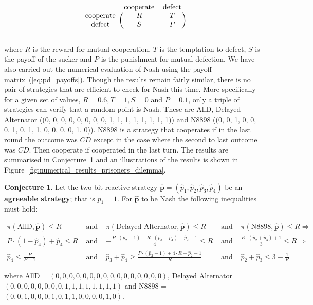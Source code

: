 \documentclass{article}
\theoremstyle{definition}
\newtheorem{conjecture}[theorem]{Conjecture}
\begin{document}
\begin{equation}\label{eq:pd_payoffs}
  \begin{blockarray}{ccc}
      & \text{cooperate} & \text{defect} \\
      \begin{block}{c(cc)}
          \text{cooperate} & R & T \\
          \text{defect} & S & P \\
      \end{block}
  \end{blockarray}
\end{equation}

where \(R\) is the reward for mutual cooperation, \(T\) is the temptation to
defect, \(S\) is the payoff of the sucker and \(P\) is the punishment for mutual
defection. We have also carried out the numerical evaluation of Nash using the
payoff matrix~(\ref{eq:pd_payoffs}). Though the results remain fairly similar,
there is no pair of strategies that are efficient to check for Nash this time.
More specifically for a given set of values, \(R=0.6, T=1, S=0\) and \(P=0.1\),
only a triple of strategies can verify that a random point is Nash. These are
AllD, Delayed Alternator ((0, 0, 0, 0, 0, 0, 0, 0, 1, 1, 1, 1, 1, 1, 1, 1)) and
N8898 ((0, 0, 1, 0, 0, 0, 1, 0, 1, 1, 0, 0, 0, 0, 1, 0)). N8898 is a strategy
that cooperates if in the last round the outcome was \(CD\) except in the case
where the second to last outcome was \(CD\). Then cooperate if cooperated in the
last turn. The results are summarised in Conjecture~\ref{conjecture:nash_from_numerical_results_pd} and an illustrations of
the results is shown in Figure~\ref{fig:numerical_results_prisoners_dilemma}.

\begin{conjecture}\label{conjecture:nash_from_numerical_results_pd}
  Let the two-bit reactive strategy \(\mathbf{\hat{p}} = (\hat{p}_{1}, \hat{p}_{2}, \hat{p}_{3}, \hat{p}_{4})\) be an \textbf{agreeable
  strategy}; that is \(p_1 = 1\). For \(\mathbf{\hat{p}}\) to be Nash the
  following inequalities must hold:
  
  \begin{align*}
    \pi(\text{AllD}, \mathbf{\hat{p}}) \leq R & \text{ and } & \pi(\text{Delayed Alternator}, \mathbf{\hat{p}}) \leq R & \text{ and } & \pi(\text{N8898}, \mathbf{\hat{p}}) \leq R \Rightarrow \\
    P \cdot (1 - \hat{p}_{4}) + \hat{p}_{4}  \leq R & \text{ and }  & - \frac{P \cdot (\hat{p}_{2} - 1) - R \cdot (\hat{p}_{3} - \hat{p}_{4}) - \hat{p}_{2} - 1}{4} \leq R  & \text{ and } & \frac{R \cdot (\hat{p}_{2} + \hat{p}_{3}) + 1}{3} \leq R \Rightarrow \\
    \hat{p}_4 \leq \frac{P}{P - 1} & \text{ and } & \hat{p}_3 + \hat{p}_4 \geq \frac{P \cdot (\hat{p}_2 - 1) + 4 \cdot R - \hat{p}_2 - 1}{R} & \text{ and }  &  \hat{p}_2 + \hat{p}_3 \leq 3 - \frac{1}{R}
  \end{align*}
  
  where AllD\(=(0, 0, 0, 0, 0, 0, 0, 0, 0, 0, 0, 0, 0, 0, 0, 0)\),
  Delayed Alternator = \((0, 0, 0, 0, 0, 0, 0, 0, 1, 1, 1, 1, 1, 1, 1, 1)\) and
  N8898 = \((0, 0, 1, 0, 0, 0, 1, 0, 1, 1, 0, 0, 0, 0, 1, 0)\).
  \end{conjecture}
\end{document}
